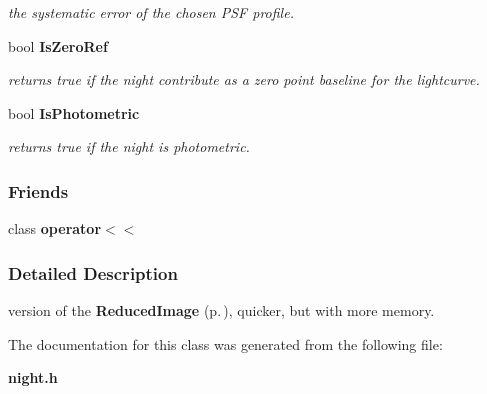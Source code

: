\begin{CompactItemize}
\begin{CompactList}\small\item\em the systematic error of the chosen PSF profile.\item\end{CompactList}\item 
{}
bool {\bf Is\-Zero\-Ref}\label{class_night_m17}

\begin{CompactList}\small\item\em returns true if the night contribute as a zero point baseline for the lightcurve.\item\end{CompactList}\item 
{}
bool {\bf Is\-Photometric}\label{class_night_m18}

\begin{CompactList}\small\item\em returns true if the night is photometric.\item\end{CompactList}\end{CompactItemize}
\subsubsection*{Friends}
\begin{CompactItemize}
\item 
class {\bf operator$<$$<$}
\end{CompactItemize}


\subsubsection{Detailed Description}
version of the {\bf Reduced\-Image} {\rm (p.\,\pageref{class_reducedimage})}, quicker, but with more memory.



The documentation for this class was generated from the following file:\begin{CompactItemize}
\item 
{\bf night.h}\end{CompactItemize}
